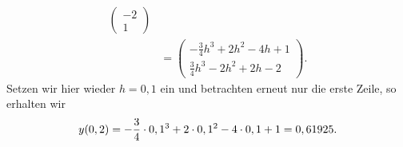 \documentclass{exercise}
\begin{document}
\begin{enumerate}
\begin{align*}
{\begin{pmatrix}
                -2\\
                1
            \end{pmatrix}}\\
            &= \begin{pmatrix}
                -\frac{3}{4}h^3 + 2h^2 - 4h + 1\\
                \frac{3}{4}h^3 - 2h^2 + 2h - 2
            \end{pmatrix}.
        \end{align*}
        Setzen wir hier wieder \(h = 0,1\) ein und betrachten erneut nur die erste Zeile, so erhalten wir
        \[
            y\parentheses*{0,2} = -\frac{3}{4} \cdot 0,1^3 + 2 \cdot 0,1^2 - 4 \cdot 0,1 + 1 = 0,61925.
        \]
    \end{enumerate}
\end{document}
